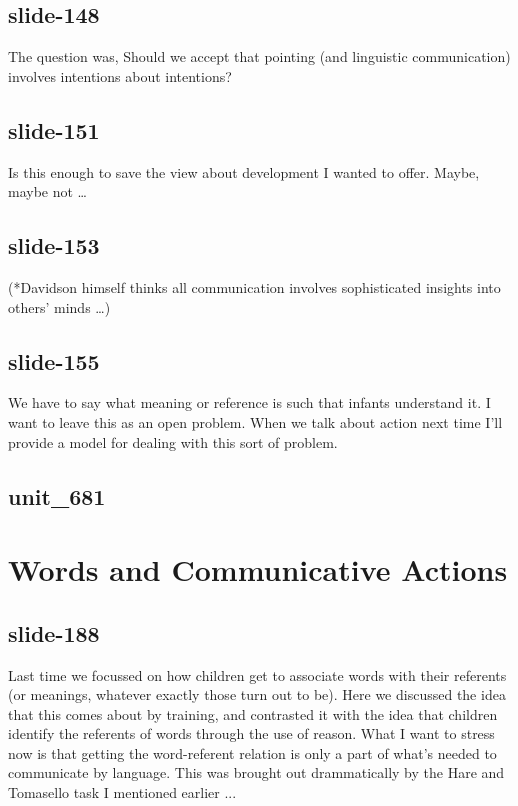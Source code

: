 \documentclass[12pt,\papersize]{extarticle}
\begin{document}
 
\subsection{slide-148}
The question was, Should we accept that pointing (and linguistic communication) involves intentions about intentions?
 
 
\subsection{slide-151}
Is this enough to save the view about development I wanted to offer. Maybe, maybe not …
 
 
\subsection{slide-153}
(*Davidson himself thinks all communication involves sophisticated insights into others’ minds …)
 
 
\subsection{slide-155}
We have to say what meaning or reference is such that infants understand it. I want to leave this as an open problem. When we talk about action next time I'll provide a model for dealing with this sort of problem.
 
 
\subsection{unit\_681}
 
\section{Words and Communicative Actions}
 
 
\subsection{slide-188}
Last time we focussed on how children get to associate words with their referents (or meanings, whatever exactly those turn out to be).
Here we discussed the idea that this comes about by training, and contrasted it with the idea that children identify the referents of words through the use of reason.
What I want to stress now is that getting the word-referent relation is only a part of what's needed to communicate by language.
This was brought out drammatically by the Hare and Tomasello task I mentioned earlier ...
 
\end{document}
